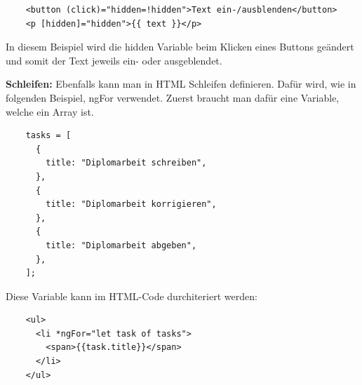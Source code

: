 \begin{lstlisting}
    <button (click)="hidden=!hidden">Text ein-/ausblenden</button>
    <p [hidden]="hidden">{{ text }}</p>
\end{lstlisting}

In diesem Beispiel wird die hidden Variable beim Klicken eines Buttons geändert und somit der Text jeweils ein- oder ausgeblendet.

\textbf{Schleifen:}
\newline
Ebenfalls kann man in HTML Schleifen definieren. Dafür wird, wie in folgenden Beispiel, ngFor verwendet.
Zuerst braucht man dafür eine Variable, welche ein Array ist.

\begin{lstlisting}
    tasks = [
      {
        title: "Diplomarbeit schreiben",
      },
      {
        title: "Diplomarbeit korrigieren",
      },
      {
        title: "Diplomarbeit abgeben",
      },
    ];
\end{lstlisting}

Diese Variable kann im HTML-Code durchiteriert werden:

\begin{lstlisting}
    <ul>
      <li *ngFor="let task of tasks">
        <span>{{task.title}}</span>
      </li>
    </ul>
\end{lstlisting}

\cite{frontend_web_angular_introduction}


